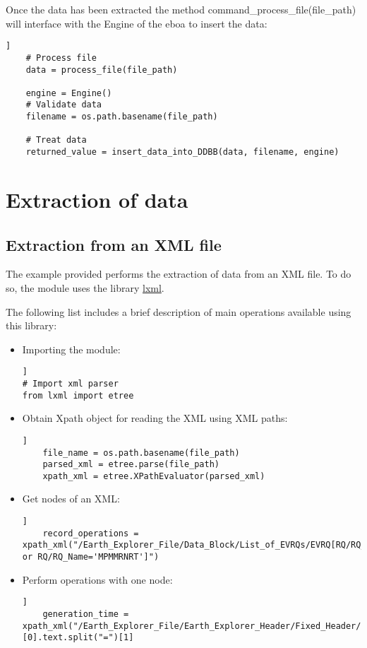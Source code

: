 Once the data has been extracted the method command\_process\_file(file\_path) will interface with the Engine of the \acrshort{eboa} to insert the data:

\begin{lstlisting}[breaklines=true, style=python]]
    # Process file
    data = process_file(file_path)

    engine = Engine()
    # Validate data
    filename = os.path.basename(file_path)

    # Treat data
    returned_value = insert_data_into_DDBB(data, filename, engine)
\end{lstlisting}

\section{Extraction of data}

\subsection{Extraction from an XML file}

The example provided performs the extraction of data from an XML file. To do so, the module uses the library \href{https://pypi.org/project/lxml/}{lxml}.

The following list includes a brief description of main operations available using this library:

\begin{itemize}
\item Importing the module:
\begin{lstlisting}[breaklines=true, style=python]]
# Import xml parser
from lxml import etree
\end{lstlisting}
\item Obtain Xpath object for reading the XML using XML paths:
\begin{lstlisting}[breaklines=true, style=python]]
    file_name = os.path.basename(file_path)
    parsed_xml = etree.parse(file_path)
    xpath_xml = etree.XPathEvaluator(parsed_xml)
\end{lstlisting}
\item Get nodes of an XML:
\begin{lstlisting}[breaklines=true, style=python]]
    record_operations = xpath_xml("/Earth_Explorer_File/Data_Block/List_of_EVRQs/EVRQ[RQ/RQ_Name='MPMMRNOM' or RQ/RQ_Name='MPMMRNRT']")
\end{lstlisting}
\item Perform operations with one node:
\begin{lstlisting}[breaklines=true, style=python]]
    generation_time = xpath_xml("/Earth_Explorer_File/Earth_Explorer_Header/Fixed_Header/Source/Creation_Date")[0].text.split("=")[1]
\end{lstlisting}
\end{itemize}

